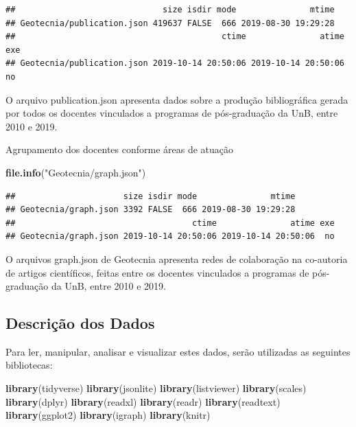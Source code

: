 \documentclass[]{article}
\newenvironment{Shaded}{\begin{snugshade}}{\end{snugshade}}
\newcommand{\KeywordTok}[1]{\textcolor[rgb]{0.13,0.29,0.53}{\textbf{#1}}}
\newcommand{\NormalTok}[1]{#1}
\newcommand{\StringTok}[1]{\textcolor[rgb]{0.31,0.60,0.02}{#1}}
\begin{document}
\begin{verbatim}
##                              size isdir mode               mtime
## Geotecnia/publication.json 419637 FALSE  666 2019-08-30 19:29:28
##                                          ctime               atime exe
## Geotecnia/publication.json 2019-10-14 20:50:06 2019-10-14 20:50:06  no
\end{verbatim}

O arquivo publication.json apresenta dados sobre a produção
bibliográfica gerada por todos os docentes vinculados a programas de
pós-graduação da UnB, entre 2010 e 2019.

Agrupamento dos docentes conforme áreas de atuação

\begin{Shaded}
\begin{Highlighting}[]
\KeywordTok{file.info}\NormalTok{(}\StringTok{"Geotecnia/graph.json"}\NormalTok{)}
\end{Highlighting}
\end{Shaded}

\begin{verbatim}
##                      size isdir mode               mtime
## Geotecnia/graph.json 3392 FALSE  666 2019-08-30 19:29:28
##                                    ctime               atime exe
## Geotecnia/graph.json 2019-10-14 20:50:06 2019-10-14 20:50:06  no
\end{verbatim}

O arquivos graph.json de Geotecnia apresenta redes de colaboração na
co-autoria de artigos científicos, feitas entre os docentes vinculados a
programas de pós-graduação da UnB, entre 2010 e 2019.

\hypertarget{descriuxe7uxe3o-dos-dados}{%
\subsection{Descrição dos Dados}\label{descriuxe7uxe3o-dos-dados}}

Para ler, manipular, analisar e visualizar estes dados, serão utilizadas
as seguintes bibliotecas:

\begin{Shaded}
\begin{Highlighting}[]
\KeywordTok{library}\NormalTok{(tidyverse)}
\KeywordTok{library}\NormalTok{(jsonlite)}
\KeywordTok{library}\NormalTok{(listviewer)}
\KeywordTok{library}\NormalTok{(scales)}
\KeywordTok{library}\NormalTok{(dplyr)}
\KeywordTok{library}\NormalTok{(readxl)}
\KeywordTok{library}\NormalTok{(readr)}
\KeywordTok{library}\NormalTok{(readtext)}
\KeywordTok{library}\NormalTok{(ggplot2)}
\KeywordTok{library}\NormalTok{(igraph)}
\KeywordTok{library}\NormalTok{(knitr)}
\end{Highlighting}
\end{Shaded}
\end{document}
